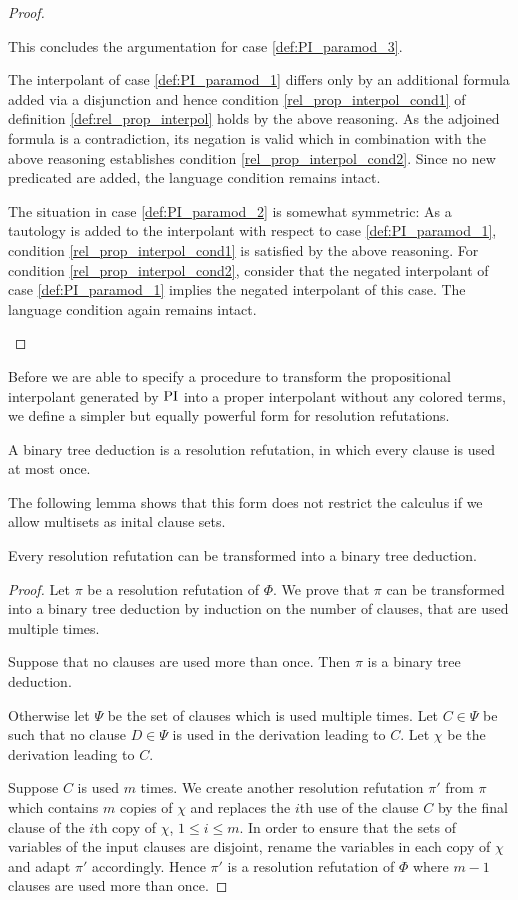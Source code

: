 \begin{proof}
\begin{itemize}
			This concludes the argumentation for case \ref{def:PI_paramod_3}. 

			The interpolant of case \ref{def:PI_paramod_1} differs only by an additional formula added via a disjunction and hence condition \ref{rel_prop_interpol_cond1} of definition \ref{def:rel_prop_interpol} holds by the above reasoning.
			As the adjoined formula is a contradiction, its negation is valid which in combination with the above reasoning establishes condition \ref{rel_prop_interpol_cond2}.
			Since no new predicated are added, the language condition remains intact. 

			The situation in case \ref{def:PI_paramod_2} is somewhat symmetric: 
			As a tautology is added to the interpolant with respect to case \ref{def:PI_paramod_1}, condition \ref{rel_prop_interpol_cond1} is satisfied by the above reasoning.
			For condition \ref{rel_prop_interpol_cond2}, consider that the negated interpolant of case \ref{def:PI_paramod_1} implies the negated interpolant of this case.
			The language condition again remains intact.
			\qedhere
	\end{itemize}
\end{proof}

Before we are able to specify a procedure to transform the propositional interpolant generated by $\operatorname{PI}$ into a proper interpolant without any colored terms, we define a simpler but equally powerful form for resolution refutations.

\begin{defi}
	A binary tree deduction is a resolution refutation, in which every clause is used at most once.
\end{defi}

The following lemma shows that this form does not restrict the calculus if we allow multisets as inital clause sets.
\begin{lemma}
	Every resolution refutation can be transformed into a binary tree deduction. 
\end{lemma}
\begin{proof}
	Let $\pi$ be a resolution refutation of $\Phi$.
	We prove that $\pi$ can be transformed into a binary tree deduction by induction on the number of clauses, that are used multiple times.

	Suppose that no clauses are used more than once. Then $\pi$ is a binary tree deduction.

	Otherwise let $\Psi$ be the set of clauses which is used multiple times.
	Let $C \in \Psi$ be such that no clause $D \in \Psi$ is used in the derivation leading to $C$. 
	Let $\chi$ be the derivation leading to $C$.

	Suppose $C$ is used $m$ times.
	We create another resolution refutation $\pi'$ from $\pi$ which contains $m$ copies of $\chi$ and replaces the $i$th use of the clause $C$ by the final clause of the $i$th copy of $\chi$, $1 \leq i \leq m$.
	In order to ensure that the sets of variables of the input clauses are disjoint, rename the variables in each copy of $\chi$ and adapt $\pi'$ accordingly.
	Hence $\pi'$ is a resolution refutation of $\Phi$ where $m-1$ clauses are used more than once.
\end{proof}

